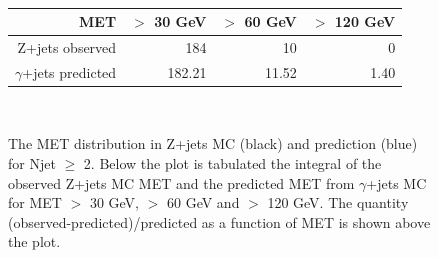 \begin{figure}[hbt]
  \begin{center}
	\\ \medskip
    \begin{tabular}{r|r|r|r}
      MET                   & $>$ 30 GeV & $>$ 60 GeV  & $>$ 120 GeV \\ \hline
      Z+jets observed         &      184   &    10       & 0          \\
      $\gamma$+jets predicted &   182.21   &    11.52    & 1.40       \\
    \end{tabular}
	\\ \medskip
    \caption{The MET distribution in Z+jets MC (black) and prediction (blue) for Njet $\ge$ 2. Below the plot is tabulated the integral of the observed Z+jets MC MET and the predicted MET from $\gamma$+jets MC for MET $>$ 30 GeV, $>$ 60 GeV and $>$ 120 GeV. The quantity (observed-predicted)/predicted as a function of MET is shown above the plot.}
    \label{fig:mcclosure}
  \end{center}
\end{figure}


